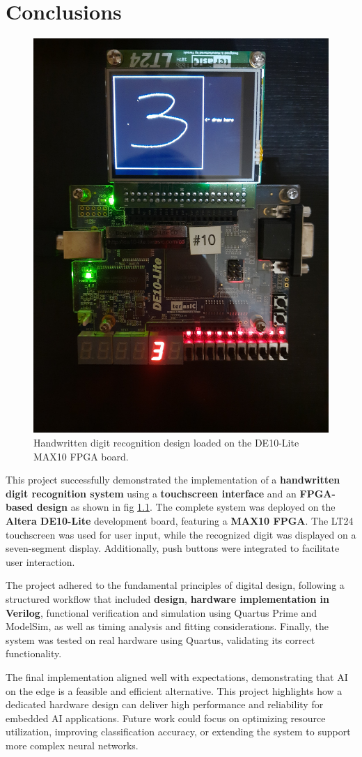 \documentclass[11pt]{report}
\begin{document}
\chapter{Conclusions}

\begin{figure}[!h]
    \centering
    \includegraphics[width=0.5\linewidth]{images/conclusions/test.jpg}
    \caption{Handwritten digit recognition design loaded on the DE10-Lite MAX10 FPGA board.}
    \label{fig:test}
\end{figure}

This project successfully demonstrated the implementation of a \textbf{handwritten digit recognition system} using a \textbf{touchscreen interface} and an \textbf{FPGA-based design} as shown in fig \ref{fig:test}. The complete system was deployed on the \textbf{Altera DE10-Lite} development board, featuring a \textbf{MAX10 FPGA}. The LT24 touchscreen was used for user input, while the recognized digit was displayed on a seven-segment display. Additionally, push buttons were integrated to facilitate user interaction.  

The project adhered to the fundamental principles of digital design, following a structured workflow that included \textbf{design}, \textbf{hardware implementation in Verilog}, functional verification and simulation using Quartus Prime and ModelSim, as well as timing analysis and fitting considerations. Finally, the system was tested on real hardware using Quartus, validating its correct functionality.  

The final implementation aligned well with expectations, demonstrating that AI on the edge is a feasible and efficient alternative. This project highlights how a dedicated hardware design can deliver high performance and reliability for embedded AI applications. Future work could focus on optimizing resource utilization, improving classification accuracy, or extending the system to support more complex neural networks. 

\printbibliography 
\end{document}
